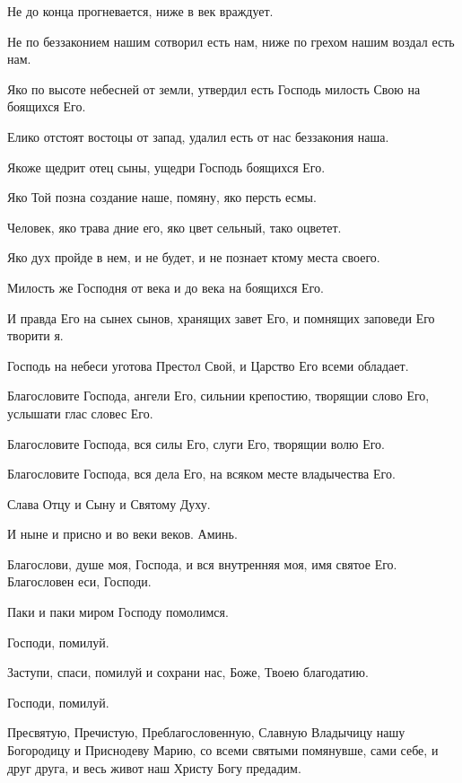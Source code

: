 \begin{mymulticols}
 Не до конца прогневается, ниже в век враждует. 

 Не по беззаконием нашим сотворил есть нам, ниже по грехом нашим воздал есть нам. 

 Яко по высоте небесней от земли, утвердил есть Господь милость Свою на боящихся Его. 

 Елико отстоят востоцы от запад, удалил есть от нас беззакония наша. 

 Якоже щедрит отец сыны, ущедри Господь боящихся Его. 

 Яко Той позна создание наше, помяну, яко персть есмы. 

 Человек, яко трава дние его, яко цвет сельный, тако оцветет. 

 Яко дух пройде в нем, и не будет, и не познает ктому места своего. 

 Милость же Господня от века и до века на боящихся Его. 

 И правда Его на сынех сынов, хранящих завет Его, и помнящих заповеди Его творити я. 

 Господь на небеси уготова Престол Свой, и Царство Его всеми обладает. 

 Благословите Господа, ангели Его, сильнии крепостию, творящии слово Его, услышати глас словес Его. 

 Благословите Господа, вся силы Его, слуги Его, творящии волю Его. 

 Благословите Господа, вся дела Его, на всяком месте владычества Его. 

 Слава Отцу и Сыну и Святому Духу. 

 И ныне и присно и во веки веков. Аминь. 

 Благослови, душе моя, Господа, и вся внутренняя моя, имя святое Его. Благословен еси, Господи.


 Паки и паки миром Господу помолимся. 

 Господи, помилуй. 

 Заступи, спаси, помилуй и сохрани нас, Боже, Твоею благодатию. 

 Господи, помилуй. 

 Пресвятую, Пречистую, Преблагословенную, Славную Владычицу нашу Богородицу и Приснодеву Марию, со всеми святыми помянувше, сами себе, и друг друга, и весь живот наш Христу Богу предадим. 


\end{mymulticols}
